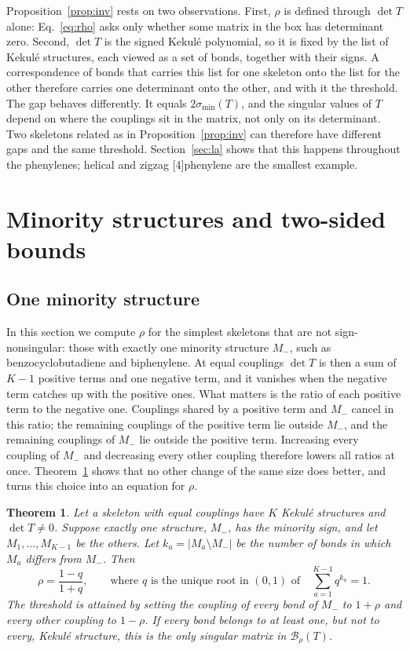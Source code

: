 \documentclass[11pt]{article}
\newtheorem{theorem}{Theorem}
\newcommand{\Bx}{\mathcal{B}}
\begin{document}
Proposition~\ref{prop:inv} rests on two observations. First, $\rho$ is defined through $\det T$ alone: Eq.~\eqref{eq:rho} asks only whether some matrix in the box has determinant zero. Second, $\det T$ is the signed Kekul\'e polynomial, so it is fixed by the list of Kekul\'e structures, each viewed as a set of bonds, together with their signs. A correspondence of bonds that carries this list for one skeleton onto the list for the other therefore carries one determinant onto the other, and with it the threshold. The gap behaves differently. It equals $2\sigma_{\min}(T)$, and the singular values of $T$ depend on where the couplings sit in the matrix, not only on its determinant. Two skeletons related as in Proposition~\ref{prop:inv} can therefore have different gaps and the same threshold. Section~\ref{sec:la} shows that this happens throughout the phenylenes; helical and zigzag [4]phenylene are the smallest example.

\section{Minority structures and two-sided bounds}
\label{sec:one}

\subsection{One minority structure}

In this section we compute $\rho$ for the simplest skeletons that are not sign-nonsingular: those with exactly one minority structure $M_-$, such as benzocyclobutadiene and biphenylene. At equal couplings $\det T$ is then a sum of $K-1$ positive terms and one negative term, and it vanishes when the negative term catches up with the positive ones. What matters is the ratio of each positive term to the negative one. Couplings shared by a positive term and $M_-$ cancel in this ratio; the remaining couplings of the positive term lie outside $M_-$, and the remaining couplings of $M_-$ lie outside the positive term. Increasing every coupling of $M_-$ and decreasing every other coupling therefore lowers all ratios at once. Theorem~\ref{thm:one} shows that no other change of the same size does better, and turns this choice into an equation for $\rho$.

\begin{theorem}
\label{thm:one}
Let a skeleton with equal couplings have $K$ Kekul\'e structures and $\det T\neq0$. Suppose exactly one structure, $M_-$, has the minority sign, and let $M_1,\dots,M_{K-1}$ be the others. Let $k_a=|M_a\setminus M_-|$ be the number of bonds in which $M_a$ differs from $M_-$. Then
\begin{equation}
\rho=\frac{1-q}{1+q},\qquad\text{where $q$ is the unique root in $(0,1)$ of}\quad \sum_{a=1}^{K-1}q^{k_a}=1 .
\label{eq:closedform}
\end{equation}
The threshold is attained by setting the coupling of every bond of $M_-$ to $1+\rho$ and every other coupling to $1-\rho$. If every bond belongs to at least one, but not to every, Kekul\'e structure, this is the only singular matrix in $\Bx_\rho(T)$.
\end{theorem}
\end{document}

